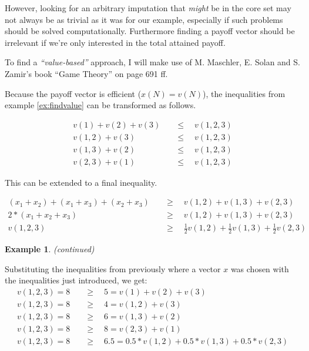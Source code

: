 \documentclass[10pt,a4paper,titlepage]{article}
\theoremstyle{plain}
\theoremstyle{definition}
\newtheorem{example}[thm]{Example} %
\begin{document}
However, looking for an arbitrary imputation that \textit{might} be in the core set may not always be as trivial as it was for our example, especially if such problems should be solved computationally. Furthermore finding a payoff vector should be irrelevant if we're only interested in the total attained payoff.

To find a \textit{\enquote{value-based}} approach, I will make use of M. Maschler, E. Solan and S. Zamir's book \enquote{Game Theory} \cite{maschler} on page 691 ff.

Because the payoff vector is efficient ($x(N) = v(N)$), the inequalities from example \ref{ex:findvalue} can be transformed as follows.

\begin{align}
    v(1) + v(2) + v(3) &\quad\leq\quad v(1, 2, 3)\\
    v(1, 2) + v(3) &\quad\leq\quad v(1, 2, 3)\\
    v(1, 3) + v(2) &\quad\leq\quad v(1, 2, 3)\\
    v(2, 3) + v(1) &\quad\leq\quad v(1, 2, 3)
\end{align}

This can be extended to a final inequality.

\begin{align*}
    (x_1+x_2)+(x_1+x_3)+(x_2+x_3) &\quad \geq \quad v(1, 2) + v(1, 3) + v(2, 3)\\[6pt]
    2*(x_1+x_2+x_3) &\quad \geq \quad v(1, 2) + v(1, 3) + v(2, 3)\\
    v(1, 2, 3) &\quad \geq \quad \frac{1}{2} v(1, 2) + \frac{1}{2} v(1, 3) + \frac{1}{2} v(2, 3)
\end{align*}

\addtocounter{thm}{-1}
\begin{example}\label{ex:valuebased}
    \textit{(continued)}

    Substituting the inequalities from previously where a vector $x$ was chosen with the inequalities just introduced, we get:
    \begin{align*}
        v(1, 2, 3) = 8\quad & \geq \quad 5 = v(1) + v(2) + v(3)\\
        v(1, 2, 3) = 8\quad & \geq \quad 4 = v(1, 2) + v(3)\\
        v(1, 2, 3) = 8\quad & \geq \quad 6 = v(1, 3) + v(2)\\
        v(1, 2, 3) = 8\quad & \geq \quad 8 = v(2, 3) + v(1)\\
        v(1, 2, 3) = 8\quad & \geq \quad 6.5 = 0.5*v(1, 2) + 0.5*v(1, 3) + 0.5*v(2, 3)
    \end{align*}
\end{example}
\end{document}
